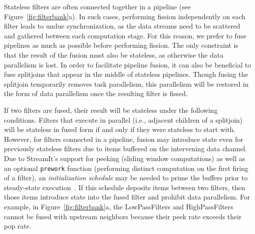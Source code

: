 Stateless filters are often connected together in a pipeline (see
Figure~\ref{fig:filterbank}a).  In such cases, performing fission
independently on each filter leads to undue synchronization, as the
data streams need to be scattered and gathered between each
computation stage.  For this reason, we prefer to fuse pipelines as
much as possible before performing fission.  The only constraint is
that the result of the fusion must also be stateless, as otherwise the
data parallelism is lost.  In order to facilitate pipeline fusion, it
can also be beneficial to fuse splitjoins that appear in the middle of
stateless pipelines.  Though fusing the splitjoin temporarily removes
task parallelism, this parallelism will be restored in the form of
data parallelism once the resulting filter is fissed.

If two filters are fused, their result will be stateless under the
following conditions.  Filters that execute in parallel (i.e.,
adjacent children of a splitjoin) will be stateless in fused form if
and only if they were stateless to start with.  However, for filters
connected in a pipeline, fusion may introduce state even for
previously stateless filters due to items buffered on the intervening
data channel.  Due to StreamIt's support for peeking (sliding window
computations) as well as an optional {\tt prework} function
(performing distinct computation on the first firing of a filter), an
{\it initialization schedule} may be needed to prime the buffers prior
to steady-state execution~\cite{karczma-thesis}.  If this schedule
deposits items between two filters, then those items introduce state
into the fused filter and prohibit data parallelism.  For example, in
Figure~\ref{fig:filterbank}a, the LowPassFilters and
HighPassFilters cannot be fused with upstream neighbors because their
peek rate exceeds their pop rate.


